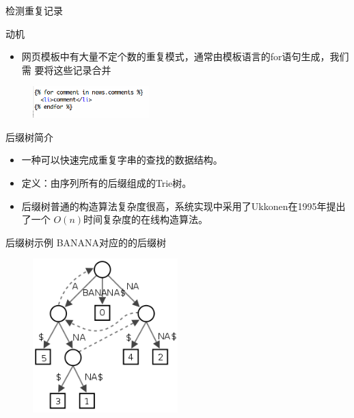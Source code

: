 \begin{frame}[label=sec-2-6]{检测重复记录}
  \begin{block}{动机}
    \begin{itemize}
    \item 网页模板中有大量不定个数的重复模式，通常由模板语言的for语句生成，我们需
      要将这些记录合并
    \end{itemize}    
    \begin{figure}[h]
      \centering
      \includegraphics[width=0.4\textwidth]{django-for}
    \end{figure}
  \end{block}
  \pause
  \begin{block}{后缀树简介}
\begin{itemize}
\item 一种可以快速完成重复字串的查找的数据结构。
\item 定义：由序列所有的后缀组成的Trie树。
\item 后缀树普通的构造算法复杂度很高，系统实现中采用了Ukkonen在1995年提出了一个
  \(O(n)\)时间复杂度的在线构造算法。
\end{itemize}
  \end{block}
\end{frame}

\begin{frame}[label=sec-2-7]{后缀树示例}
BANANA对应的的后缀树
\begin{figure}[hb]
\centering
\includegraphics[width=0.5\textwidth]{./suffix-tree-banana.png}
\end{figure}
\end{frame}

